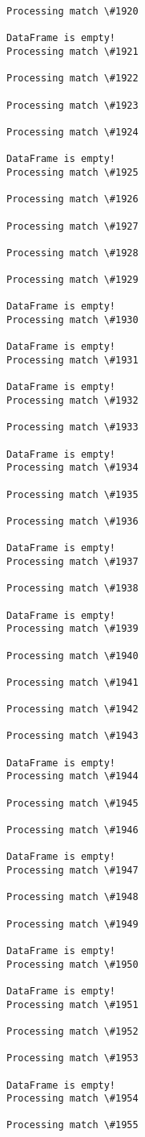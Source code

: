 \documentclass[11pt]{article}
\begin{document}
\begin{Verbatim}[commandchars=\\\{\}]
Processing match \#1920

DataFrame is empty!
Processing match \#1921

Processing match \#1922

Processing match \#1923

Processing match \#1924

DataFrame is empty!
Processing match \#1925

Processing match \#1926

Processing match \#1927

Processing match \#1928

Processing match \#1929

DataFrame is empty!
Processing match \#1930

DataFrame is empty!
Processing match \#1931

DataFrame is empty!
Processing match \#1932

Processing match \#1933

DataFrame is empty!
Processing match \#1934

Processing match \#1935

Processing match \#1936

DataFrame is empty!
Processing match \#1937

Processing match \#1938

DataFrame is empty!
Processing match \#1939

Processing match \#1940

Processing match \#1941

Processing match \#1942

Processing match \#1943

DataFrame is empty!
Processing match \#1944

Processing match \#1945

Processing match \#1946

DataFrame is empty!
Processing match \#1947

Processing match \#1948

Processing match \#1949

DataFrame is empty!
Processing match \#1950

DataFrame is empty!
Processing match \#1951

Processing match \#1952

Processing match \#1953

DataFrame is empty!
Processing match \#1954

Processing match \#1955


\end{Verbatim}
\end{document}
